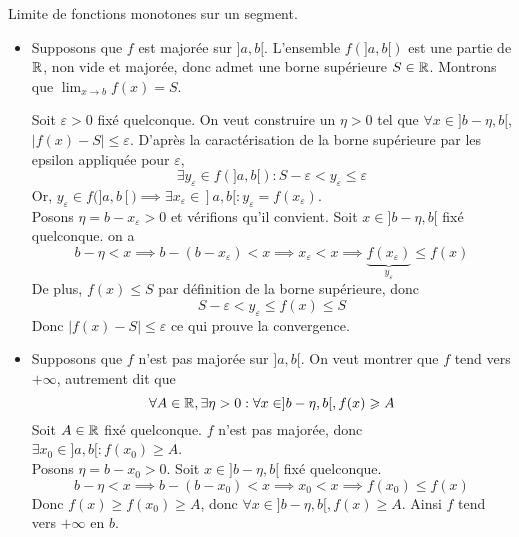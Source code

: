 \documentclass{article}
\renewenvironment{question_kholle}[2][ ]
{
	\subsection{\texorpdfstring{#2}{}}
	\notblank{#1}
	{
		\noindent #1
		\bigbreak
	}
	{}
	\begin{proof}
}
{
	\end{proof}
}
\begin{document}
{Limite de fonctions monotones sur un segment.}
	\hfill\\
	\begin{itemize}[label=$\star$]
		\item Supposons que $f$ est majorée sur $]a, b[$. L'ensemble $f(]a, b[)$ est une partie de $\mathbb R$, non vide et majorée, donc admet une borne supérieure $S \in \mathbb R$.
						      Montrons que $\lim_{ x \to b }f(x) = S$.

						      Soit $\varepsilon>0$ fixé quelconque. On veut construire un $\eta>0$ tel que $\forall x \in ]b-\eta, b[$, $\lvert f(x) - S \rvert \leqslant \varepsilon$.
						      D'après la caractérisation de la borne supérieure par les epsilon appliquée pour $\varepsilon$, $$\exists y_{\varepsilon} \in f(]a, b[) : S - \varepsilon < y_{\varepsilon} \leqslant \varepsilon$$
					      Or, $y_{\varepsilon} \in f(]a, b[) \implies \exists x_{\varepsilon}\in ]a, b[ : y_{\varepsilon} = f(x_{\varepsilon})$.\\
						      Posons $\eta = b - x_{\varepsilon} > 0$ et vérifions qu'il convient.
						      Soit $x \in ]b - \eta, b[$ fixé quelconque.
		      on a $$
			      b-\eta < x \implies b- (b - x_{\varepsilon})< x \implies x_{\varepsilon} < x \implies \underbrace{ f(x_{\varepsilon}) }_{ y_{\varepsilon} } \leqslant f(x)
		      $$
		      De plus, $f(x) \leqslant S$ par définition de la borne supérieure, donc
		      $$
			      S - \varepsilon < y_{\varepsilon} \leqslant f(x) \leqslant S
		      $$
		      Donc $\lvert f(x) - S \rvert \leqslant \varepsilon$ ce qui prouve la convergence.

		\item Supposons que $f$ n'est pas majorée sur $]a, b[$.
						      On veut montrer que $f$ tend vers $+\infty$, autrement dit que
					      $$
					      \forall A \in \mathbb R, \exists \eta >0 : \forall x \in ]b- \eta , b[, f(x)\geqslant A
					      $$
					      Soit $A \in \mathbb R$ fixé quelconque.
					      $f$ n'est pas majorée, donc $\exists x_{0} \in ]a, b[ : f(x_{0}) \geqslant A$.\\
						      Posons $\eta = b - x_{0} > 0$.
						      Soit $x \in ]b-\eta, b[$ fixé quelconque.
		      $$
			      b-\eta< x \implies b-(b-x_{0})< x \implies x_{0}<x \implies f(x_{0}) \leqslant f(x)
		      $$
		      Donc $f(x) \geqslant f(x_{0})\geqslant A$, donc $\forall x \in ]b-\eta, b[, f(x) \geqslant A$.
		      Ainsi $f$ tend vers $+\infty$ en $b$.
	\end{itemize}
\end{question_kholle}
\end{document}
